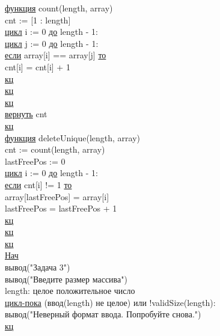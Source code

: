\noindent \underline{функция} count(length, array)\\
\null\qquad cnt := [1 : length]\\
\null\qquad \underline{цикл} i := 0 \underline{до} length - 1:\\
\null\qquad \null\qquad \underline{цикл} j := 0 \underline{до} length - 1:\\
\null\qquad \null\qquad \null\qquad \underline{если} array[i] == array[j] \underline{то}\\
\null\qquad \null\qquad \null\qquad \null\qquad cnt[i] = cnt[i] + 1\\
\null\qquad \null\qquad \null\qquad \underline{кц}\\
\null\qquad \null\qquad \underline{кц}\\
\null\qquad \underline{кц}\\
\null\qquad \underline{вернуть} cnt\\
\underline{кц}\\

\noindent\underline{функция} deleteUnique(length, array)\\
\null\qquad cnt := count(length, array)\\
\null\qquad lastFreePos := 0\\
\null\qquad \underline{цикл} i := 0 \underline{до} length - 1:\\
\null\qquad \null\qquad \underline{если} cnt[i] != 1 \underline{то}\\
\null\qquad \null\qquad \null\qquad array[lastFreePos] = array[i]\\
\null\qquad \null\qquad \null\qquad lastFreePos = lastFreePos + 1\\
\null\qquad \null\qquad \underline{кц}\\
\null\qquad \underline{кц}\\
\underline{кц}\\

\noindent \underline{Нач}\\
\null\qquad вывод("Задача 3")\\
\null\qquad вывод("Введите размер массива")\\

\noindent
\null\qquad length: целое положительное число\\
\null\qquad \underline{цикл-пока} (ввод(length) не целое) или !validSize(length):\\
\null\qquad \qquad вывод("Неверный формат ввода. Попробуйте снова.")\\
\null\qquad \underline{кц}\\

